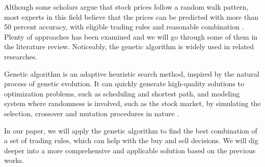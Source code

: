 \documentclass{article}
\begin{document}
Although some scholars argue that stock prices follow a random walk pattern,
most experts in this field believe that the prices can be predicted with more than 50 percent accuracy,
with eligible trading rules and reasonable combination \cite{stock-market-prediction-with-multiple-classifiers}.
Plenty of approaches has been examined and we will go through some of them in the literature review.
Noticeably, the genetic algorithm is widely used in related researches.


Genetic algorithm is an adaptive heuristic search method,
inspired by the natural process of genetic evolution.
It can quickly generate high-quality solutions to optimization problems, such as scheduling and shortest path,
and modeling system where randomness is involved, such as the stock market,
by simulating the selection, crossover and mutation procedures in nature
\cite{genetic-algorithm-review-and-application}.

In our paper, we will apply the genetic algorithm to
find the best combination of a set of trading rules, which can help with the buy and sell decisions.
We will dig deeper into a more comprehensive and applicable solution based on the previous works.




\end{document}
